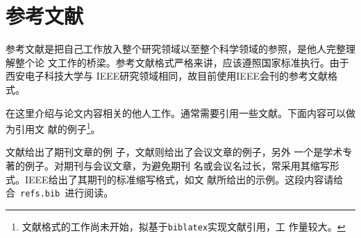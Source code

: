 

\chapter{参考文献}
\label{cha:bibliography}

参考文献是把自己工作放入整个研究领域以至整个科学领域的参照，是他人完整理解整个论
文工作的桥梁。参考文献格式严格来讲，应该遵照国家标准执行。由于西安电子科技大学与
IEEE研究领域相同，故目前使用IEEE会刊的参考文献格式。


在这里介绍与论文内容相关的他人工作。通常需要引用一些文献。下面内容可以做为引用文
献的例子\footnote{文献格式的工作尚未开始，拟基于\texttt{biblatex}实现文献引用，工
  作量较大。}。

文献给出了期刊文章的例
子，文献则给出了会议文章的例子，另外
一个是学术专著\cite{book11:_examp_book_title}的例子。对期刊与会议文章，为避免期刊
名或会议名过长，常采用其缩写形式。IEEE给出了其期刊的标准缩写格式，如文
献所给出的示例。这段内容请给
合~\texttt{refs.bib}~进行阅读。

